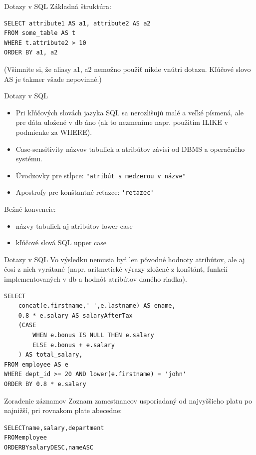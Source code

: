 \documentclass[12pt]{beamer}
\begin{document}
\begin{frame}[fragile]{Dotazy v SQL}
Základná štruktúra:
\begin{verbatim}
SELECT attribute1 AS a1, attribute2 AS a2
FROM some_table AS t
WHERE t.attribute2 > 10
ORDER BY a1, a2
\end{verbatim}
(Všimnite si, že aliasy a1, a2 nemožno použiť nikde vnútri dotazu. Kľúčové slovo AS je takmer všade nepovinné.)
\end{frame}

\begin{frame}[fragile]{Dotazy v SQL}
\begin{itemize}
\item Pri kľúčových slovách jazyka SQL sa nerozlišujú malé a veľké písmená,
ale pre dáta uložené v db áno (ak to nezmeníme napr. použitím ILIKE v podmienke za WHERE).
\item Case-sensitivity názvov tabuliek a atribútov závisí od DBMS a operačného systému.
\item Úvodzovky pre stĺpce: \verb|"atribút s medzerou v názve"|
\item Apostrofy pre konštantné reťazce: \verb|'reťazec'|
\end{itemize}

Bežné konvencie:
\begin{itemize}
\item názvy tabuliek aj atribútov lower case
\item kľúčové slová SQL upper case
\end{itemize}
\end{frame}

\begin{frame}[fragile]{Dotazy v SQL}
Vo výsledku nemusia byť len pôvodné hodnoty atribútov, ale aj čosi z nich vyrátané (napr. aritmetické výrazy zložené z konštánt, funkcií implementovaných v db a hodnôt atribútov daného riadka).\\[3mm]

\begin{verbatim}
SELECT
    concat(e.firstname,' ',e.lastname) AS ename,
    0.8 * e.salary AS salaryAfterTax
    (CASE
        WHEN e.bonus IS NULL THEN e.salary
        ELSE e.bonus + e.salary
    ) AS total_salary,
FROM employee AS e
WHERE dept_id >= 20 AND lower(e.firstname) = 'john'
ORDER BY 0.8 * e.salary
\end{verbatim}
\end{frame}

\begin{frame}[fragile]{Zoradenie záznamov}
Zoznam zamestnancov usporiadaný od najvyššieho platu po najnižší, pri rovnakom plate abecedne:
\begin{alltt}
SELECT name, salary, department
FROM employee
\alert{ORDER BY} salary DESC, name ASC
\end{alltt}
\end{frame}
\end{document}
